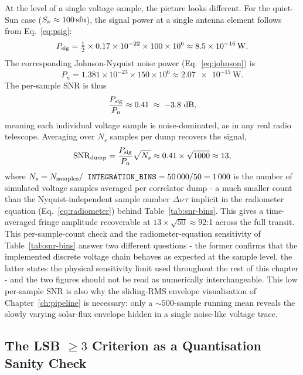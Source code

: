 At the level of a single voltage sample, the picture looks different. For the
quiet-Sun case ($S_\nu\approx\SI{100}{\mathrm{sfu}}$), the signal power at a single antenna
element follows from Eq.~\eqref{eq:psig}:
\begin{equation}
  P_{\rm sig} = \tfrac{1}{2}\times0.17\times10^{-22}\times100\times10^6
    \approx \SI{8.5e-16}{\watt}.
  \label{eq:psig-value}
\end{equation}
The corresponding Johnson-Nyquist noise power (Eq.~\eqref{eq:johnson}) is
\begin{equation}
  P_n = 1.381\times10^{-23}\times150\times10^6
    \approx \SI{2.07e-15}{\watt}.
  \label{eq:johnson-value}
\end{equation}
The per-sample SNR is thus
\begin{equation}
  \frac{P_{\rm sig}}{P_n} \approx 0.41 \;\approx\; -3.8~\si{dB},
  \label{eq:persample-snr}
\end{equation}
meaning each individual voltage sample is noise-dominated, as in any real radio
telescope. Averaging over $N_s$ samples per dump recovers the signal,
\begin{equation}
  \mathrm{SNR}_{\rm dump} = \frac{P_{\rm sig}}{P_n}\sqrt{N_s}
    \approx 0.41\times\sqrt{1000} \approx 13,
  \label{eq:snr-dump}
\end{equation}
where $N_s = N_{\rm samples}/\texttt{INTEGRATION\_BINS} = 50\,000/50 = 1\,000$ is the
number of simulated voltage samples averaged per correlator dump - a much smaller
count than the Nyquist-independent sample number $\Delta\nu\,\tau$ implicit in the
radiometer equation (Eq.~\eqref{eq:radiometer}) behind Table~\ref{tab:snr-bins}. This
gives a time-averaged fringe amplitude recoverable at $13\times\sqrt{50}\approx92$:1
across the full transit. This per-sample-count check and the radiometer-equation
sensitivity of Table~\ref{tab:snr-bins} answer two different questions - the former
confirms that the implemented discrete voltage chain behaves as expected at the
sample level, the latter states the physical sensitivity limit used throughout the
rest of this chapter - and the two figures should not be read as numerically
interchangeable. This low per-sample SNR is also why the sliding-RMS envelope
visualisation of Chapter~\ref{ch:pipeline} is necessary: only a $\sim\!500$-sample
running mean reveals the slowly varying solar-flux envelope hidden in a single
noise-like voltage trace.

\subsection{The LSB $\geq 3$ Criterion as a Quantisation Sanity Check}

